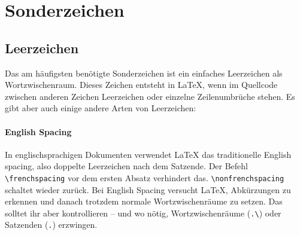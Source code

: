\section{Sonderzeichen}

\subsection{Leerzeichen}

Das am häufigsten benötigte Sonderzeichen ist ein einfaches Leerzeichen als Wortzwischenraum.
Dieses Zeichen entsteht in \LaTeX, wenn im Quellcode zwischen anderen Zeichen Leerzeichen oder einzelne Zeilenumbrüche stehen.
Es gibt aber auch einige andere Arten von Leerzeichen:


\paragraph{English Spacing}
In englischsprachigen Dokumenten verwendet LaTeX das traditionelle English spacing, also doppelte Leerzeichen nach dem Satzende.
Der Befehl \texttt{\textbackslash frenchspacing} vor dem ersten Absatz verhindert das.
\texttt{\textbackslash nonfrenchspacing} schaltet wieder zurück.
Bei English Spacing versucht \LaTeX, Abkürzungen zu erkennen und danach trotzdem normale Wortzwischenräume zu setzen.
Das solltet ihr aber kontrollieren – und wo nötig,
Wortzwischenräume (\texttt{.\textbackslash\textvisiblespace}) oder Satzenden (\texttt{\textbackslash@.\textvisiblespace}) erzwingen.

